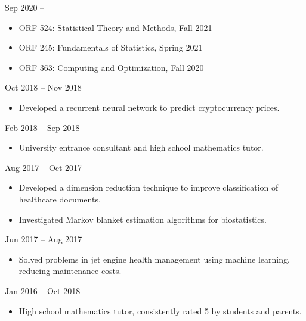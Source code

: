 \documentclass[
  date,
  number,
]{wgu-cv}
\begin{document}


{}
{Sep 2020 --}

\begin{itemize}
  \item
    ORF 524:
    Statistical Theory and Methods,
    Fall 2021
  \item
    ORF 245:
    Fundamentals of Statistics,
    Spring 2021
  \item
    ORF 363:
    Computing and Optimization,
    Fall 2020
\end{itemize}


{}
{Oct 2018 -- Nov 2018}

\begin{itemize}
	\item Developed a recurrent neural network to predict cryptocurrency prices.
\end{itemize}


{}
{Feb 2018 -- Sep 2018}

\begin{itemize}
\item University entrance consultant and high school mathematics tutor.
\end{itemize}


{}
{Aug 2017 -- Oct 2017}

\begin{itemize}
	\item Developed a dimension reduction technique to
    improve classification of healthcare documents.
	\item Investigated Markov blanket estimation algorithms for biostatistics.
\end{itemize}


{}
{Jun 2017 -- Aug 2017}

\begin{itemize}
	\item Solved problems in jet engine health management using machine learning,
    reducing maintenance costs.
\end{itemize}


{}
{Jan 2016 -- Oct 2018}

\begin{itemize}
	\item High school mathematics tutor,
    consistently rated 5\textsuperscript{\star} by students and parents.
\end{itemize}
\end{document}
